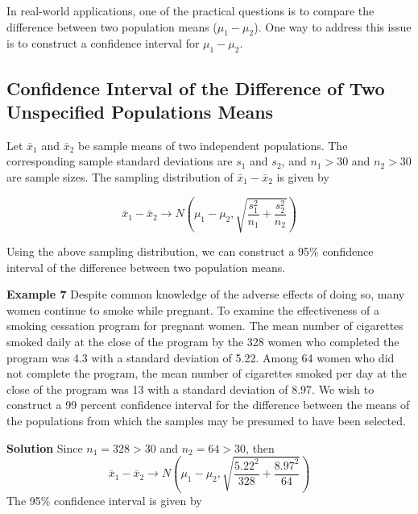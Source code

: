 \documentclass[
]{book}
\begin{document}
In real-world applications, one of the practical questions is to compare the difference between two population means (\(\mu_1 - \mu_2\)). One way to address this issue is to construct a confidence interval for \(\mu_1 - \mu_2\).

\hypertarget{confidence-interval-of-the-difference-of-two-unspecified-populations-means}{%
\subsection{Confidence Interval of the Difference of Two Unspecified Populations Means}\label{confidence-interval-of-the-difference-of-two-unspecified-populations-means}}

Let \(\bar{x}_1\) and \(\bar{x}_2\) be sample means of two independent populations. The corresponding sample standard deviations are \(s_1\) and \(s_2\), and \(n_1 > 30\) and \(n_2 >30\) are sample sizes. The sampling distribution of \(\bar{x}_1 - \bar{x}_2\) is given by

\[
\bar{x}_1 - \bar{x}_2 \to N\left(\mu_1 - \mu_2, \sqrt{\frac{s_1^2}{n_1} + \frac{s_2^2}{n_2}} \right)
\]

Using the above sampling distribution, we can construct a 95\% confidence interval of the difference between two population means.

\textbf{Example 7} Despite common knowledge of the adverse effects of doing so, many women continue to smoke while pregnant. To examine the effectiveness of a smoking cessation program for pregnant women. The mean number of cigarettes smoked daily at the close of the program by the 328 women who completed the program was 4.3 with a standard deviation of 5.22. Among 64 women who did not complete the program, the mean number of cigarettes smoked per day at the close of the program was 13 with a standard deviation of 8.97. We wish to construct a 99 percent confidence interval for the difference between the means of the populations from which the samples may be presumed to have been selected.

\textbf{Solution} Since \(n_1 = 328 > 30\) and \(n_2 = 64 > 30\), then
\[
\bar{x}_1 - \bar{x}_2 \to N\left(\mu_1 - \mu_2, \sqrt{\frac{5.22^2}{328} + \frac{8.97^2}{64}}\right)
\]
The 95\% confidence interval is given by
\end{document}
